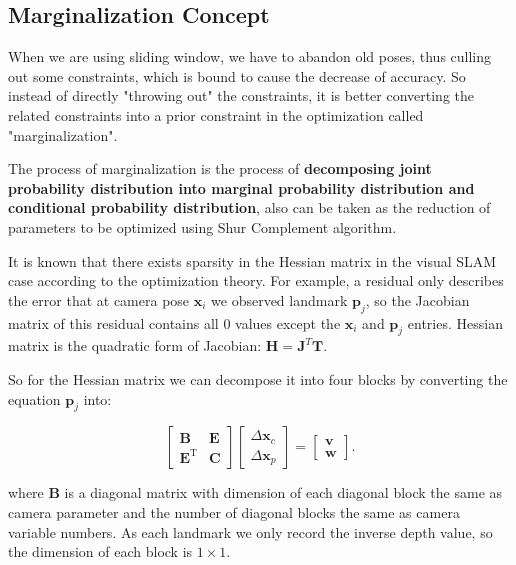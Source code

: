 \documentclass[12pt]{report}   %
\newcounter{case}
\begin{document}
\subsection{Marginalization Concept}

When we are using sliding window, we have to abandon old poses, thus culling out some constraints, which is bound to cause the decrease of accuracy. So instead of directly "throwing out" the constraints, it is better converting the related constraints into a prior constraint in the optimization called "marginalization".

The process of marginalization is the process of \textbf{decomposing joint probability distribution into marginal probability distribution and conditional probability distribution}, also can be taken as the reduction of parameters to be optimized using Shur Complement algorithm.


It is known that there exists sparsity in the Hessian matrix in the visual SLAM case according to the optimization theory. For example, a residual only describes the error that at camera pose $\mathbf{x}_i$ we observed landmark $\mathbf{p}_j$, so the Jacobian matrix of this residual contains all 0 values except the $\mathbf{x}_i$ and $\mathbf{p}_j$ entries. Hessian matrix is the quadratic form of Jacobian: $\mathbf{H} = \mathbf{J}^T\mathbf{T}$. 



So for the Hessian matrix we can decompose it into four blocks by converting the equation $\mathbf{p}_j$ into:

\begin{equation}
\label{eq:linearequations}
\left[ \begin{matrix}
\bm{B}   &   \bm{E} \\
\bm{E^\mathrm{T}} &   \bm{C}
\end{matrix}\right] 
\left[ \begin{array}{l}
\Delta \bm{x}_c \\
\Delta \bm{x}_p 
\end{array} \right] = 
\left[ \begin{array}{l}
\bm{v} \\
\bm{w} 
\end{array} \right].
\end{equation}

where $\bm{B}$ is a diagonal matrix with dimension of each diagonal block the same as camera parameter and the number of diagonal blocks the same as camera variable numbers. As each landmark we only record the inverse depth value, so the dimension of each block is $1\times1$. 
\end{document}

